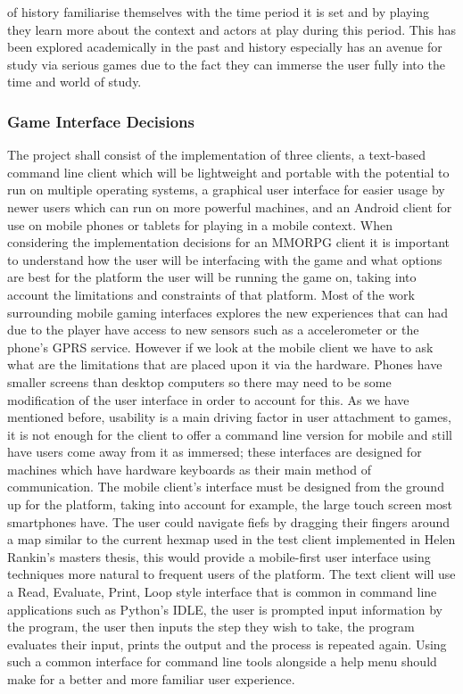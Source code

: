 \documentclass{article}
\begin{document}
of history familiarise themselves with the time period it is set and by playing they learn more about the context and actors at play during this period. This has been explored academically in the past\cite{seriousgames} and history especially has an avenue for study via serious games due to the fact they can immerse the user fully into the time and world of study.
	\subsubsection{Game Interface Decisions}
	The project shall consist of the implementation of three clients, a text-based command line client which will be lightweight and portable with the potential to run on multiple operating systems, a graphical user interface for easier usage by newer users which can run on more powerful machines, and an Android client for use on mobile phones or tablets for playing in a mobile context. When considering the implementation decisions for an MMORPG client it is important to understand how the user will be interfacing with the game and what options are best for the platform the user will be running the game on, taking into account the limitations and constraints of that platform. Most of the work surrounding mobile gaming interfaces explores the new experiences that can had due to the player have access to new sensors such as a accelerometer or the phone's GPRS service. However if we look at the mobile client we have to ask what are the limitations that are placed upon it via the hardware. Phones have smaller screens than desktop computers so there may need to be some modification of the user interface in order to account for this. As we have mentioned before, usability is a main driving factor in user attachment to games\cite{Christou:2012:EPP:2367616.2367630}, it is not enough for the client to offer a command line version for mobile and still have users come away from it as immersed; these interfaces are designed for machines which have hardware keyboards as their main method of communication. The mobile client's interface must be designed from the ground up for the platform, taking into account for example, the large touch screen most smartphones have. The user could navigate fiefs by dragging their fingers around a map similar to the current hexmap used in the test client implemented in Helen Rankin's masters thesis\cite{helenrankin}, this would provide a mobile-first user interface using techniques more natural to frequent users of the platform. The text client will use a Read, Evaluate, Print, Loop style interface that is common in command line applications such as Python's IDLE\cite{python}, the user is prompted input information by the program, the user then inputs the step they wish to take, the program evaluates their input, prints the output and the process is repeated again. Using such a common interface for command line tools alongside a help menu should make for a better and more familiar user experience.
\end{document}
